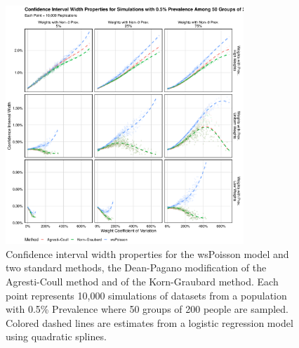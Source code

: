 \documentclass[AMA,STIX1COL]{WileyNJD-v2}
\begin{document}
\begin{figure}
\centering
\includegraphics[width=0.8\textwidth]{figures/perfect_confidence_interval_width_50_groups_0_005_prev}
\caption{Confidence interval width properties for the wsPoisson model and two standard methods, the Dean-Pagano modification of the Agresti-Coull method and of the Korn-Graubard method.
Each point represents 10,000 simulations of datasets from a population with 0.5\% Prevalence where 50 groups of 200 people are sampled.
Colored dashed lines are estimates from a logistic regression model using quadratic splines.}
\label{fig:perfect_confidence_interval_width_50_groups_0_005_prev}
\end{figure}
\end{document}
